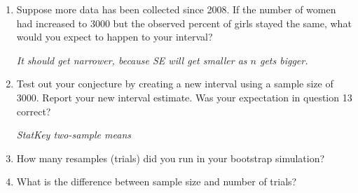 \begin{enumerate}
\begin{enumerate}
         \item  Suppose more data has been collected since 2008. If
           the number of women had increased to 3000 but the observed
           percent of girls stayed the same, what would you expect to
           happen to your interval? 
\begin{students}
          \vspace{2cm}
\end{students}
\begin{key}
 {\it It should get narrower, because SE will get smaller as $n$ gets bigger. }      
\end{key}

         \item  Test out your conjecture by creating a new interval
           using a sample size of 3000. Report your new interval
           estimate. Was your expectation in question 13 correct?

\begin{students}
          \vspace{2cm}
\end{students}
\begin{key}
 {\it StatKey two-sample means }      
\end{key} 

         \item  How many resamples (trials) did you run in your bootstrap
           simulation? 
\begin{students}
          \vspace{3cm}
\end{students}
\begin{key}
 {\it  }      
\end{key}

         \item  What is the difference between sample size and number
           of trials? 
\begin{students}
        \vspace{4cm}
\end{students}
\begin{key}
 {\it  }      
\end{key}

         \end{enumerate}
         

\end{enumerate}
